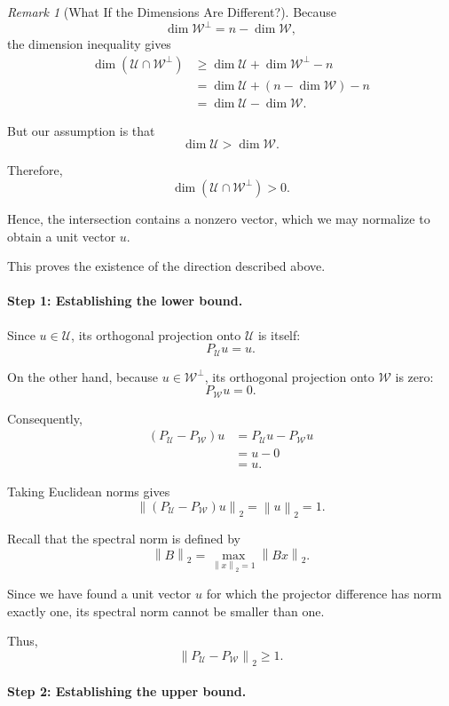 \documentclass[14pt,letterpaper]{article}
\theoremstyle{plain}
\theoremstyle{definition}
\theoremstyle{remark}
\newtheorem{remark}[theorem]{Remark}
\newcommand{\norm}[1]{\left\lVert #1 \right\rVert}
\begin{document}
\begin{remark}[What If the Dimensions Are Different?]
Because
\[
\dim\mathcal W^\perp
=
n-\dim\mathcal W,
\]
the dimension inequality gives
\[
\begin{aligned}
\dim(\mathcal U\cap\mathcal W^\perp)
&\geq
\dim\mathcal U+\dim\mathcal W^\perp-n\\
&=
\dim\mathcal U+(n-\dim\mathcal W)-n\\
&=
\dim\mathcal U-\dim\mathcal W.
\end{aligned}
\]

But our assumption is that
\[
\dim\mathcal U>\dim\mathcal W.
\]

Therefore,
\[
\boxed{
\dim(\mathcal U\cap\mathcal W^\perp)>0.
}
\]

Hence, the intersection contains a nonzero
vector, which we may normalize to obtain
a unit vector $u$.

This proves the existence of the direction
described above.

\paragraph{Step 1: Establishing the lower bound.}

Since $u\in\mathcal U$, its orthogonal
projection onto $\mathcal U$ is itself:
\[
P_{\mathcal U}u=u.
\]

On the other hand, because
$u\in\mathcal W^\perp$, its orthogonal
projection onto $\mathcal W$ is zero:
\[
P_{\mathcal W}u=0.
\]

Consequently,
\[
\begin{aligned}
(P_{\mathcal U}-P_{\mathcal W})u
&=P_{\mathcal U}u-P_{\mathcal W}u\\
&=u-0\\
&=u.
\end{aligned}
\]

Taking Euclidean norms gives
\[
\norm{(P_{\mathcal U}-P_{\mathcal W})u}_2
=
\norm{u}_2
=
1.
\]

Recall that the spectral norm is defined by
\[
\norm{B}_2
=
\max_{\norm{x}_2=1}\norm{Bx}_2.
\]

Since we have found a unit vector $u$
for which the projector difference has
norm exactly one, its spectral norm
cannot be smaller than one.

Thus,
\[
\boxed{
\norm{P_{\mathcal U}-P_{\mathcal W}}_2
\geq1.
}
\]

\paragraph{Step 2: Establishing the upper bound.}


\end{remark}
\end{document}
